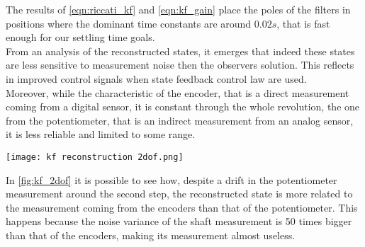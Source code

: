 The results of \cref{eqn:riccati_kf} and \cref{eqn:kf_gain} place the poles of the filters in positions where the dominant time constants are around $0.02 s$, that is fast enough for our settling time goals. \\
From an analysis of the reconstructed states, it emerges that indeed these states are less sensitive to measurement noise then the observers solution. This reflects in improved control signals when state feedback control law are used. \\
Moreover, while the characteristic of the encoder, that is a direct measurement coming from a digital sensor, it is constant through the whole revolution, the one from the potentiometer, that is an indirect measurement from an analog sensor, it is less reliable and limited to some range. 
\begin{figure*}[h]
	\centering
	\texttt{[image: kf reconstruction 2dof.png]}
	\caption{Kalman filter reconstruction compared with available measurements}
	\label{fig:kf_2dof}
\end{figure*}
In \cref{fig:kf_2dof} it is possible to see how, despite a drift in the potentiometer measurement around the second step, the reconstructed state is more related to the measurement coming from the encoders than that of the potentiometer. This happens because the noise variance of the shaft measurement is 50 times bigger than that of the encoders, making its measurement almost useless. 

